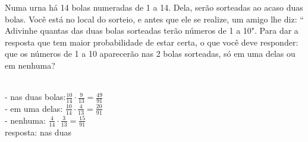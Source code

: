 \begin{ex}
Numa urna há 14 bolas numeradas de 1 a 14. Dela, serão sorteadas ao acaso duas bolas. Você está no local do sorteio, e antes que ele se realize, um amigo lhe diz: “ Adivinhe quantas das duas bolas sorteadas terão números de 1 a 10". Para dar a resposta que tem maior probabilidade de estar certa, o que você deve responder: que os números de 1 a 10 aparecerão nas 2 bolas sorteadas, só em uma delas ou em nenhuma?
 \begin{sol}
  \phantom{A} \\
 - nas duas bolas:\hspace{0,2cm}$\frac{10}{14}\cdot\frac{9}{13}=\frac{49}{91}$\\
 - em uma delas:\hspace{0,2cm} $\frac{10}{14}\cdot\frac{4}{13}=\frac{20}{91}$ \\
 - nenhuma:\hspace{0,2cm} $\frac{4}{14}\cdot\frac{3}{13}=\frac{15}{91}$\\
 resposta: nas duas
 \end{sol}
 \end{ex}